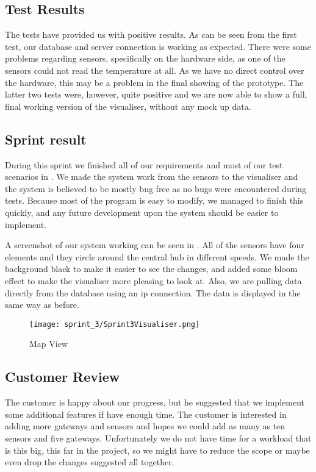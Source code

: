 \documentclass[../document]{subfiles}
\begin{document}
\subsection{Test Results}
The tests have provided us with positive results. As can be seen from the first test, our database and server connection is working as expected. There were some problems regarding sensors, specifically on the hardware side, as one of the sensors could not read the temperature at all. As we have no direct control over the hardware, this may be a problem in the final showing of the prototype. The latter two tests were, however, quite positive and we are now able to show a full, final working version of the visualiser, without any mock up data.

\subsection{Sprint result}
During this sprint we finished all of our requirements  and most of our test scenarios in . We made the system work from the sensors to the visualiser and the system is believed to be mostly bug free as no bugs were encountered during tests. Because most of the program is easy to modify, we managed to finish this quickly, and any future development upon the system should be easier to implement.

A screenshot of our system working can be seen in . All of the sensors have four elements and they circle around the central hub in different speeds. We made the background black to make it easier to see the changes, and added some bloom effect to make the visualiser more pleasing to look at. Also, we are pulling data directly from the database using an ip connection. The data is displayed in the same way as before. 

\begin{figure}
	\centering
	\texttt{[image: sprint\_3/Sprint3Visualiser.png]}
	\caption{Map View}
	\label{fig:map_view_3}
\end{figure}

\subsection{Customer Review}
The customer is happy about our progress, but he suggested that we implement some additional features if have enough time. The customer is interested in adding more gateways and sensors and hopes we could add as many as ten sensors and five gateways. Unfortunately we do not have time for a workload that is this big, this far in the project, so we might have to reduce the scope or maybe even drop the changes suggested all together.
\end{document}
